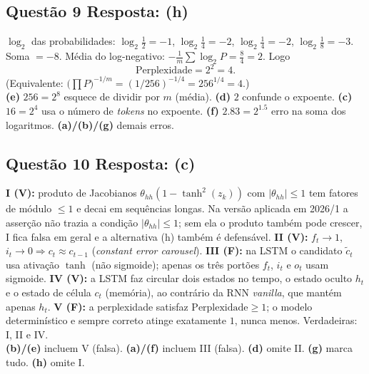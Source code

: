 \documentclass[11pt,a4paper]{article}
\begin{document}
\subsection*{Questão 9 \textemdash{} Resposta: (h)}
$\log_2$ das probabilidades: $\log_2\tfrac12 = -1$, $\log_2\tfrac14 = -2$, $\log_2\tfrac14 = -2$, $\log_2\tfrac18 = -3$. Soma $= -8$. Média do log-negativo: $-\tfrac{1}{m}\sum \log_2 P = \tfrac{8}{4} = 2$. Logo
\[
\text{Perplexidade} = 2^{2} = 4.
\]
(Equivalente: $\big(\prod P\big)^{-1/m} = (1/256)^{-1/4} = 256^{1/4} = 4$.)\\
\textbf{(e)} $256 = 2^{8}$ esquece de dividir por $m$ (média).
\textbf{(d)} $2$ confunde o expoente.
\textbf{(c)} $16 = 2^4$ usa o número de \textit{tokens} no expoente.
\textbf{(f)} $2.83 = 2^{1.5}$ erro na soma dos logaritmos.
\textbf{(a)/(b)/(g)} demais erros.

\subsection*{Questão 10 \textemdash{} Resposta: (c)}
\textbf{I (V):} produto de Jacobianos $\theta_{hh}(1 - \tanh^2(z_k))$ com $|\theta_{hh}| \le 1$ tem fatores de módulo $\le 1$ e decai em sequências longas. Na versão aplicada em 2026/1 a asserção não trazia a condição $|\theta_{hh}| \le 1$; sem ela o produto também pode crescer, I fica falsa em geral e a alternativa (h) também é defensável.
\textbf{II (V):} $f_t \to 1$, $i_t \to 0 \Rightarrow c_t \approx c_{t-1}$ (\textit{constant error carousel}).
\textbf{III (F):} na LSTM o candidato $\tilde{c}_t$ usa ativação $\tanh$ (não sigmoide); apenas os três portões $f_t$, $i_t$ e $o_t$ usam sigmoide.
\textbf{IV (V):} a LSTM faz circular dois estados no tempo, o estado oculto $h_t$ e o estado de célula $c_t$ (memória), ao contrário da RNN \textit{vanilla}, que mantém apenas $h_t$.
\textbf{V (F):} a perplexidade satisfaz $\text{Perplexidade} \ge 1$; o modelo determinístico e sempre correto atinge exatamente $1$, nunca menos.
Verdadeiras: I, II e IV.\\
\textbf{(b)/(e)} incluem V (falsa).
\textbf{(a)/(f)} incluem III (falsa).
\textbf{(d)} omite II.
\textbf{(g)} marca tudo.
\textbf{(h)} omite I.

\color{black}
\end{document}
